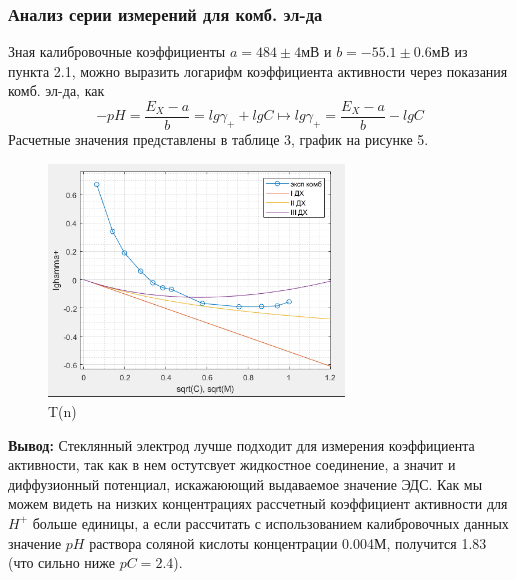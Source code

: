 \documentclass[a4paper, 12pt]{article}
\begin{document}
\subsubsection{Анализ серии измерений для комб. эл-да}
Зная калибровочные коэффициенты $a = 484 \pm 4$мВ и $b=-55.1 \pm 0.6$мВ из пункта 2.1, можно выразить логарифм коэффициента активности через показания комб. эл-да, как
\begin{equation}
    -pH=\frac{E_{X} - a}{b}= lg\gamma _{+} + lgC \mapsto lg\gamma _{+}=\frac{E_{X} - a}{b} - lgC
\end{equation}
Расчетные значения представлены в таблице 3, график на рисунке 5.
\begin{figure}[h!]
    \begin{center}
    \includegraphics[width=0.7\textwidth]{3_6_lghamma_sqrtC_komb.png}
    \end{center}
    \caption{T(n)}
\end{figure}

\textbf{Вывод:} Стеклянный электрод лучше подходит для измерения коэффициента активности, так как в нем остутсвует жидкостное соединение, а значит и диффузионный потенциал, искажаюющий выдаваемое значение ЭДС. Как мы можем видеть на низких концентрациях рассчетный коэффициент активности для $H^{+}$ больше единицы, а если рассчитать с использованием калибровочных данных значение $pH$ раствора соляной кислоты концентрации 0.004М, получится 1.83 (что сильно ниже $pC = 2.4$). 
\end{document}
